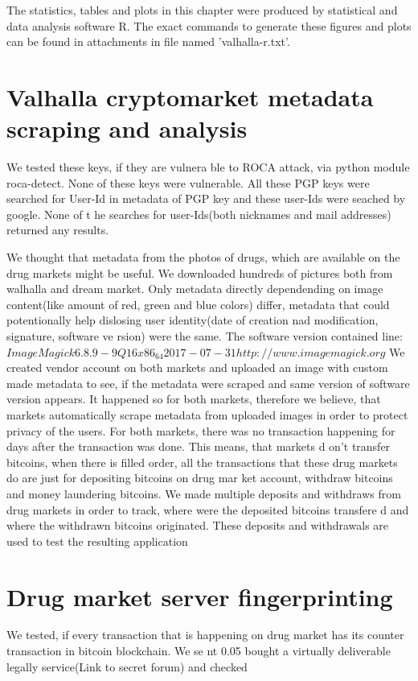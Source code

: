 \documentclass[
  digital, %
  table,   %
  lof,     %
  lot,     %
  oneside
]{fithesis3}
\begin{document}
The statistics, tables and plots in this chapter were produced by statistical and data analysis software R.
The exact commands to generate these figures and plots can be found in attachments in file named 'valhalla-r.txt'.

\section{Valhalla cryptomarket metadata scraping and analysis}
We tested these keys, if they are vulnera
ble to ROCA attack, via python module roca-detect. None of these keys were vulnerable.
All these PGP keys were searched for User-Id in metadata of PGP key and these user-Ids were seached by google. None of t
he searches for user-Ids(both nicknames and mail addresses) returned any results.

We thought that metadata from the photos of drugs, which are available on the drug markets might be useful.
We downloaded hundreds of pictures both from walhalla and dream market.
Only metadata directly dependending on image content(like amount of red, green and blue colors) differ,
metadata that could potentionally help dislosing user identity(date of creation nad modification, signature, software ve
rsion) were the same.
The software version contained line: $ImageMagick 6.8.9-9 Q16 x86_64 2017-07-31 http://www.imagemagick.org$
We created vendor account on both markets and uploaded an image with custom made metadata to see,
if the metadata were scraped and same version of software version appears. It happened so for both markets,
therefore we believe, that markets automatically scrape metadata from uploaded images in order to protect privacy of the
 users.
For both markets, there was no transaction happening for days after the transaction was done. This means, that markets d
on't transfer bitcoins,
when there is filled order, all the transactions that these drug markets do are just for depositing bitcoins on drug mar
ket account,
withdraw bitcoins and money laundering bitcoins.
We made multiple deposits and withdraws from drug markets in order to track, where were the deposited bitcoins transfere
d and where the withdrawn bitcoins originated.
These deposits and withdrawals are used to test the resulting application
\section{Drug market server fingerprinting}

We tested, if every transaction that is happening on drug market has its counter transaction in bitcoin blockchain.
We se
nt 0.05 bought a virtually deliverable legally service(Link to secret forum) and checked
\end{document}
